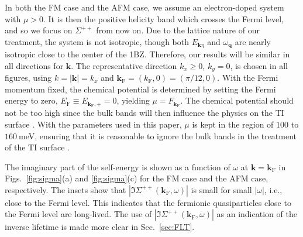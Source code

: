 \documentclass[aps, prb, twocolumn,amsmath,amssymb,floatfix]{revtex4-2}
\begin{document}
In both the FM case and the AFM case, we assume an electron-doped system with $\mu > 0$. It is then the positive helicity band which crosses the Fermi level, and so we focus on $\Sigma^{++}$ from now on. Due to the lattice nature of our treatment, the system is not isotropic, though both $E_{\boldsymbol{k}\eta}$ and $\omega_{\boldsymbol{q}}$ are nearly isotropic close to the center of the 1BZ. Therefore, our results will be similar in all directions for $\boldsymbol{k}$. The representative direction $k_x \geq 0$, $k_y = 0$, is chosen in all figures, using $k = |\boldsymbol{k}| = k_x$ and $\boldsymbol{k}_{\textrm{F}} = (k_{\textrm{F}}, 0) = (\pi/12, 0)$. With the Fermi momentum fixed, the chemical potential is determined by setting the Fermi energy to zero, $E_{\textrm{F}} \equiv E_{\boldsymbol{k}_{\textrm{F}}, +} = 0$, yielding $\mu = F_{\boldsymbol{k}_{\textrm{F}}}$. The chemical potential should not be too high since the bulk bands will then influence the physics on the TI surface \cite{Hugdal3SCTI}. With the parameters used in this paper, $\mu$ is kept in the region of $100$ to $160~$meV, ensuring that it is reasonable to ignore the bulk bands in the treatment of the TI surface \cite{Hugdal3SCTI}.

The imaginary part of the self-energy is shown as a function of $\omega$ at $\boldsymbol{k} = \boldsymbol{k}_{\textrm{F}}$ in Figs.~\ref{fig:sigma}(a) and \ref{fig:sigma}(c) for the FM case and the AFM case, respectively. The insets show that $|\Im\Sigma^{++}(\boldsymbol{k}_{\textrm{F}}, \omega)|$ is small for small $|\omega|$, i.e.,  close to the Fermi level. This indicates that the fermionic quasiparticles close to the Fermi level are long-lived. The use of $|\Im\Sigma^{++}(\boldsymbol{k}_{\textrm{F}}, \omega)|$ as an indication of the inverse lifetime is made more clear in Sec.~\ref{sec:FLT}. 
\end{document}

